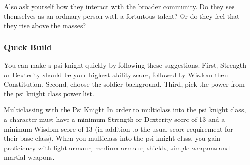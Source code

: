 Also ask yourself how they interact with the broader community.
Do they see themselves as an ordinary person with a fortuitous
talent?
Or do they feel that they rise above the masses?

\subsubsection{Quick Build}
You can make a psi knight quickly by following these suggestions.
First, Strength or Dexterity should be your highest ability score,
followed by Wisdom then Constitution.
Second, choose the soldier background.
Third, pick the  power
from the psi knight class power list.

\begin{DndSidebar}[float=htbp]{Multiclassing with the Psi Knight}
    In order to
    multiclass into the psi knight class,
    a character must have a minimum Strength or Dexterity score of 13
    and a minimum Wisdom score of 13
    (in addition to the usual score requirement for their base class).
    When you multiclass into the psi knight class,
    you gain proficiency with
    light armour, medium armour, shields, simple weapons
    and martial weapons.
\end{DndSidebar}

